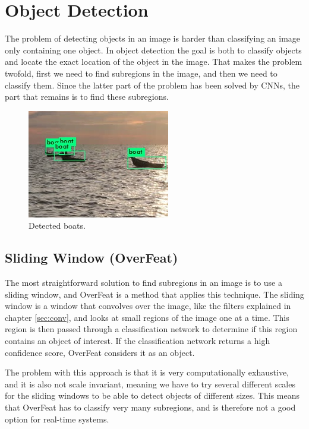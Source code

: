 


\chapter{Object Detection}
The problem of detecting objects in an image is harder than classifying an image only containing one object. In object detection the goal is both to classify objects and locate the exact location of the object in the image. That makes the problem twofold, first we need to find subregions in the image, and then we need to classify them. Since the latter part of the problem has been solved by CNNs, the part that remains is to find these subregions. 

\begin{figure}[h!]
    \centering
    \includegraphics[scale=0.8]{images/predictions2.jpg}
    \caption{Detected boats.}
    \label{fig:boat_detection}
\end{figure}


\section{Sliding Window (OverFeat)}
The most straightforward solution to find subregions in an image is to use a sliding window, and OverFeat \citep{Sermanet2013} is a method that applies this technique. The sliding window is a window that convolves over the image, like the filters explained in chapter \ref{sec:conv}, and looks at small regions of the image one at a time. This region is then passed through a classification network to determine if this region contains an object of interest. If the classification network returns a high confidence score, OverFeat considers it as an object. 

\vspace{3mm}

The problem with this approach is that it is very computationally exhaustive, and it is also not scale invariant, meaning we have to try several different scales for the sliding windows to be able to detect objects of different sizes. This means that OverFeat has to classify very many subregions, and is therefore not a good option for real-time systems.


